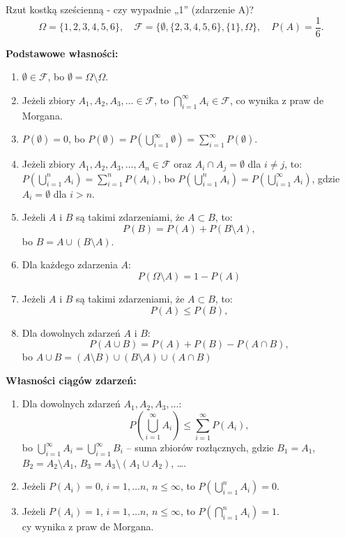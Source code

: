 \documentclass[final,a4paper,openany,12pt]{mwbk}
\begin{document}
\begin{Prz}
Rzut kostką sześcienną -  czy wypadnie „1” (zdarzenie A)?
\[ \Omega = \{1, 2, 3, 4, 5, 6\}, \quad \mathcal{F} = \{\emptyset, \{2, 3, 4, 5, 6\}, \{1\}, \Omega\}, \quad P(A) = \frac{1}{6}. \]
\end{Prz}

\noindent\textbf{Podstawowe własności:}
\begin{enumerate}
    \item $\emptyset \in \mathcal{F}$, bo $\emptyset = \Omega \setminus \Omega$.

    \item Jeżeli zbiory $A_1, A_2, A_3, \dots \in \mathcal{F}$, to $\bigcap_{i=1}^{\infty} A_i \in \mathcal{F}$, co wynika z praw de Morgana.

    \item $P(\emptyset) = 0$, bo $P(\emptyset) = P\left(\bigcup_{i=1}^{\infty} \emptyset\right) = \sum_{i=1}^{\infty} P(\emptyset)$.

    \item Jeżeli zbiory $A_1, A_2, A_3, \dots, A_n \in \mathcal{F}$ oraz $A_i \cap A_j = \emptyset$ dla $i \neq j$, to:
    $P\left(\bigcup_{i=1}^{n} A_i\right) = \sum_{i=1}^{n} P(A_i)$, bo $P\left(\bigcup_{i=1}^{n} A_i\right) = P\left(\bigcup_{i=1}^{\infty} A_i\right)$, gdzie $A_i = \emptyset$ dla $i > n$.

    \item Jeżeli $A$ i $B$ są takimi zdarzeniami, że $A \subset B$, to:
    \[ P(B) = P(A) + P(B \setminus A), \] bo $B = A \cup (B \setminus A)$.

    \item Dla każdego zdarzenia $A$: \[ P(\Omega\setminus A) = 1 - P(A) \]

    \item Jeżeli $A$ i $B$ są takimi zdarzeniami, że $A \subset B$, to:
    \[ P(A) \leq P(B), \]

    \item Dla dowolnych zdarzeń $A$ i $B$:
    \[ P(A \cup B) = P(A) + P(B) - P(A \cap B), \] bo $A \cup B = (A \setminus B) \cup (B \setminus A) \cup (A \cap B)$
\end{enumerate}

\noindent\textbf{Własności ciągów zdarzeń:}
\begin{enumerate}
    \item Dla dowolnych zdarzeń $A_1, A_2, A_3, \dots$:
    \[ P\left(\bigcup_{i=1}^{\infty} A_i\right) \leq \sum_{i=1}^{\infty} P(A_i), \]
    bo $\bigcup_{i=1}^{\infty} A_i = \bigcup_{i=1}^{\infty} B_i$ – suma zbiorów rozłącznych, gdzie
    $B_1 = A_1$, $B_2 = A_2 \setminus A_1$, $B_3 = A_3 \setminus (A_1 \cup A_2)$, \dots.

    \item Jeżeli $P(A_i) = 0$, $i = 1, \dots n$, $n \leq \infty$, to $P\left(\bigcup_{i=1}^{n} A_i\right) = 0$.

    \item Jeżeli $P(A_i) = 1$, $i = 1, \dots n$, $n \leq \infty$, to $P\left(\bigcap_{i=1}^{n} A_i\right) = 1$. \\
    cy wynika z praw de Morgana.
\end{enumerate}
\end{document}
